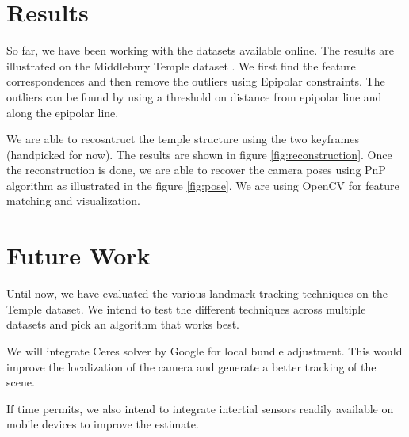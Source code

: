 \documentclass{article}
\begin{document}
\section{Results}
So far, we have been working with the datasets available online. The results are illustrated on the Middlebury Temple dataset \cite{middlebury}. We first find the feature correspondences and then remove the outliers using Epipolar constraints. The outliers can be found by using a threshold on distance from epipolar line and along the epipolar line.

We are able to recosntruct the temple structure using the two keyframes (handpicked for now). The results are shown in figure \ref{fig:reconstruction}. Once the reconstruction is done, we are able to recover the camera poses using PnP algorithm as illustrated in the figure \ref{fig:pose}. We are using OpenCV for feature matching and visualization.


\section{Future Work}
Until now, we have evaluated the various landmark tracking techniques on the Temple dataset. We intend to test the different techniques across multiple datasets and pick an algorithm that works best.

We will integrate Ceres solver by Google for local bundle adjustment. This would improve the localization of the camera and generate a better tracking of the scene.

If time permits, we also intend to integrate intertial sensors readily available on mobile devices to improve the estimate\cite{tumsensor}.\\
\end{document}
